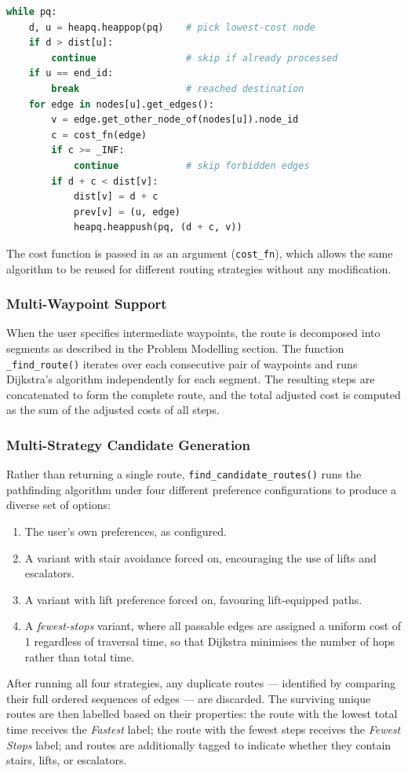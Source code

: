 \documentclass[a4paper,10pt]{amsart}
\begin{document}
\begin{lstlisting}[language=Python,caption={Core loop of Dijkstra's algorithm},float=htbp,label={lst:dijkstra_core_loop}]
while pq:
    d, u = heapq.heappop(pq)    # pick lowest-cost node
    if d > dist[u]:
        continue                # skip if already processed
    if u == end_id:
        break                   # reached destination
    for edge in nodes[u].get_edges():
        v = edge.get_other_node_of(nodes[u]).node_id
        c = cost_fn(edge)
        if c >= _INF:
            continue            # skip forbidden edges
        if d + c < dist[v]:
            dist[v] = d + c
            prev[v] = (u, edge)
            heapq.heappush(pq, (d + c, v))
\end{lstlisting}

The cost function is passed in as an argument (\texttt{cost\_fn}), which allows the same algorithm to be reused for different routing strategies without any modification.

\subsubsection{Multi-Waypoint Support}

When the user specifies intermediate waypoints, the route is decomposed into segments as described in the Problem Modelling section.
The function \texttt{\_find\_route()} iterates over each consecutive pair of waypoints and runs Dijkstra's algorithm independently for each segment.
The resulting steps are concatenated to form the complete route, and the total adjusted cost is computed as the sum of the adjusted costs of all steps.

\subsubsection{Multi-Strategy Candidate Generation}

Rather than returning a single route, \texttt{find\_candidate\_routes()} runs the pathfinding algorithm under four different preference configurations to produce a diverse set of options:
\begin{enumerate}
    \item The user's own preferences, as configured.
    \item A variant with stair avoidance forced on, encouraging the use of lifts and escalators.
    \item A variant with lift preference forced on, favouring lift-equipped paths.
    \item A \emph{fewest-stops} variant, where all passable edges are assigned a uniform cost of 1 regardless of traversal time, so that Dijkstra minimises the number of hops rather than total time.
\end{enumerate}
After running all four strategies, any duplicate routes --- identified by comparing their full ordered sequences of edges --- are discarded.
The surviving unique routes are then labelled based on their properties: the route with the lowest total time receives the \emph{Fastest} label; the route with the fewest steps receives the \emph{Fewest Stops} label; and routes are additionally tagged to indicate whether they contain stairs, lifts, or escalators.
\end{document}
